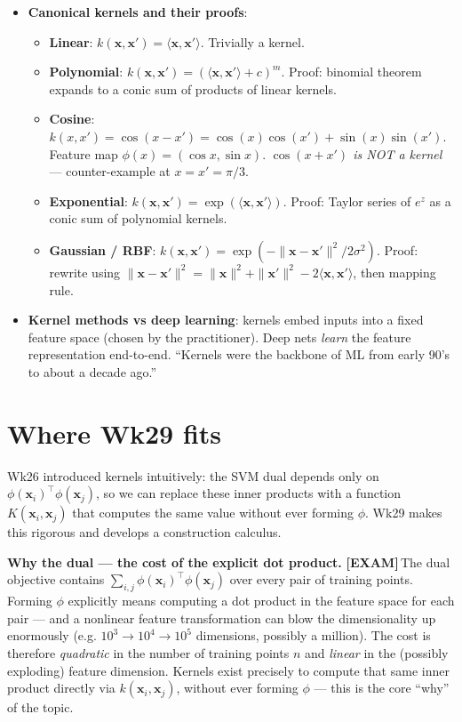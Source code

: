 \documentclass[11pt, a4paper]{article}
\newcommand{\examflag}{\textcolor{tipBd}{\textbf{[EXAM]}}\,}
\begin{document}
\begin{tldrbox}
\begin{itemize}[leftmargin=*]
\begin{itemize}
  \end{itemize}
  \item \textbf{Canonical kernels and their proofs}:
  \begin{itemize}
    \item \textbf{Linear}: $k(\mathbf{x}, \mathbf{x}') = \langle\mathbf{x}, \mathbf{x}'\rangle$. Trivially a kernel.
    \item \textbf{Polynomial}: $k(\mathbf{x}, \mathbf{x}') = (\langle\mathbf{x},\mathbf{x}'\rangle + c)^m$. Proof: binomial theorem expands to a conic sum of products of linear kernels.
    \item \textbf{Cosine}: $k(x, x') = \cos(x - x') = \cos(x)\cos(x') + \sin(x)\sin(x')$. Feature map $\phi(x) = (\cos x, \sin x)$. \emph{$\cos(x + x')$ is NOT a kernel} — counter-example at $x = x' = \pi/3$.
    \item \textbf{Exponential}: $k(\mathbf{x}, \mathbf{x}') = \exp(\langle\mathbf{x}, \mathbf{x}'\rangle)$. Proof: Taylor series of $e^z$ as a conic sum of polynomial kernels.
    \item \textbf{Gaussian / RBF}: $k(\mathbf{x}, \mathbf{x}') = \exp(-\|\mathbf{x}-\mathbf{x}'\|^2 / 2\sigma^2)$. Proof: rewrite using $\|\mathbf{x}-\mathbf{x}'\|^2 = \|\mathbf{x}\|^2 + \|\mathbf{x}'\|^2 - 2\langle\mathbf{x}, \mathbf{x}'\rangle$, then mapping rule.
  \end{itemize}
  \item \textbf{Kernel methods vs deep learning}: kernels embed inputs into a fixed feature space (chosen by the practitioner). Deep nets \emph{learn} the feature representation end-to-end. ``Kernels were the backbone of ML from early 90's to about a decade ago.''
\end{itemize}
\end{tldrbox}

\section{Where Wk29 fits}

Wk26 introduced kernels intuitively: the SVM dual depends only on $\phi(\mathbf{x}_i)^\top\phi(\mathbf{x}_j)$, so we can replace these inner products with a function $K(\mathbf{x}_i, \mathbf{x}_j)$ that computes the same value without ever forming $\phi$. Wk29 makes this rigorous and develops a construction calculus.

\textbf{Why the dual — the cost of the explicit dot product.} \examflag{}The dual objective contains $\sum_{i,j}\phi(\mathbf{x}_i)^\top\phi(\mathbf{x}_j)$ over every pair of training points. Forming $\phi$ explicitly means computing a dot product in the feature space for each pair — and a nonlinear feature transformation can blow the dimensionality up enormously (e.g. $10^3 \to 10^4 \to 10^5$ dimensions, possibly a million). The cost is therefore \emph{quadratic} in the number of training points $n$ and \emph{linear} in the (possibly exploding) feature dimension. Kernels exist precisely to compute that same inner product directly via $k(\mathbf{x}_i, \mathbf{x}_j)$, without ever forming $\phi$ — this is the core ``why'' of the topic.
\end{document}
